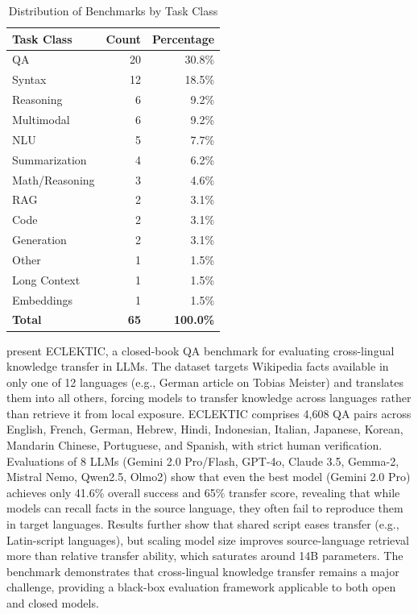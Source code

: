 \documentclass[acmsmall]{acmart}
\begin{document}
\begin{table}[t]
\centering
\caption{Distribution of Benchmarks by Task Class}
\label{tab:tasks}
\begin{tabular}{@{}lrr@{}}
\toprule
\textbf{Task Class} & \textbf{Count} & \textbf{Percentage} \\
\midrule
QA & 20 & 30.8\% \\
Syntax & 12 & 18.5\% \\
Reasoning & 6 & 9.2\% \\
Multimodal & 6 & 9.2\% \\
NLU & 5 & 7.7\% \\
Summarization & 4 & 6.2\% \\
Math/Reasoning & 3 & 4.6\% \\
RAG & 2 & 3.1\% \\
Code & 2 & 3.1\% \\
Generation & 2 & 3.1\% \\
Other & 1 & 1.5\% \\
Long Context & 1 & 1.5\% \\
Embeddings & 1 & 1.5\% \\
\midrule
\textbf{Total} & \textbf{65} & \textbf{100.0\%} \\
\bottomrule
\end{tabular}
\end{table}



 \citep{goldman2025eclekticnovelchallengeset} present ECLEKTIC, a closed-book QA benchmark for evaluating cross-lingual knowledge transfer in LLMs. The dataset targets Wikipedia facts available in only one of 12 languages (e.g., German article on Tobias Meister) and translates them into all others, forcing models to transfer knowledge across languages rather than retrieve it from local exposure. ECLEKTIC comprises 4,608 QA pairs across English, French, German, Hebrew, Hindi, Indonesian, Italian, Japanese, Korean, Mandarin Chinese, Portuguese, and Spanish, with strict human verification. Evaluations of 8 LLMs (Gemini 2.0 Pro/Flash, GPT-4o, Claude 3.5, Gemma-2, Mistral Nemo, Qwen2.5, Olmo2) show that even the best model (Gemini 2.0 Pro) achieves only 41.6\% overall success and 65\% transfer score, revealing that while models can recall facts in the source language, they often fail to reproduce them in target languages. Results further show that shared script eases transfer (e.g., Latin-script languages), but scaling model size improves source-language retrieval more than relative transfer ability, which saturates around 14B parameters. The benchmark demonstrates that cross-lingual knowledge transfer remains a major challenge, providing a black-box evaluation framework applicable to both open and closed models.
\end{document}
